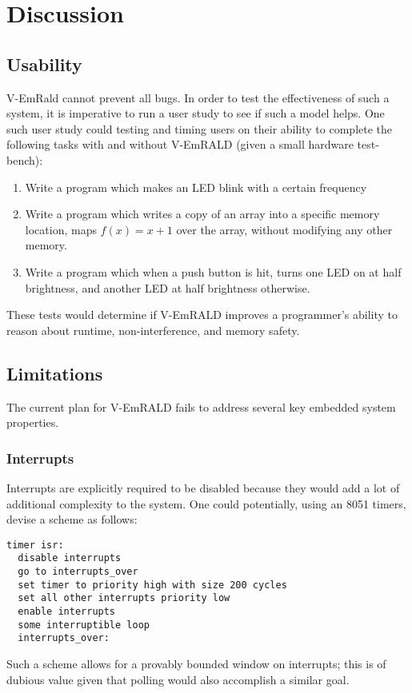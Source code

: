 \documentclass[preprint,11pt]{sigplanconf}
\begin{document}
\section{Discussion}
\subsection{Usability}
V-EmRald cannot prevent all bugs. In order to test the effectiveness
of such a system, it is imperative to run a user study to see if such
a model helps. One such user study could testing and timing users on their
ability to complete the following tasks with and without V-EmRALD (given a small
hardware test-bench):
\begin{enumerate}
\item
  Write a program which makes an LED blink with a certain frequency
\item
  Write a program which writes a copy of an array into a specific
  memory location, maps $f(x) = x+1$ over the array, without modifying
  any other memory.
\item
  Write a program which when a push button is hit, turns one LED on at
  half brightness, and another LED at half brightness otherwise.
\end{enumerate}
These tests would determine if V-EmRALD improves a programmer's
ability to reason about runtime, non-interference, and memory safety.
\subsection{Limitations}
The current plan for V-EmRALD fails to address several key
embedded system properties.
\subsubsection{Interrupts}
Interrupts are explicitly required to be disabled because they would
add a lot of additional complexity to the system. One could potentially,
using an 8051 timers, devise a scheme as follows:
\vfill
\begin{lstlisting}[caption={The timer ISR is used to gaurantee a bound on the amount of time interrupt might be executing.}]
  timer isr:
  disable interrupts
  go to interrupts_over
  set timer to priority high with size 200 cycles
  set all other interrupts priority low
  enable interrupts
  some interruptible loop
  interrupts_over:
\end{lstlisting}
Such a scheme allows for a provably bounded window on interrupts; this is of dubious value given that polling would also accomplish
a similar goal.
\end{document}
